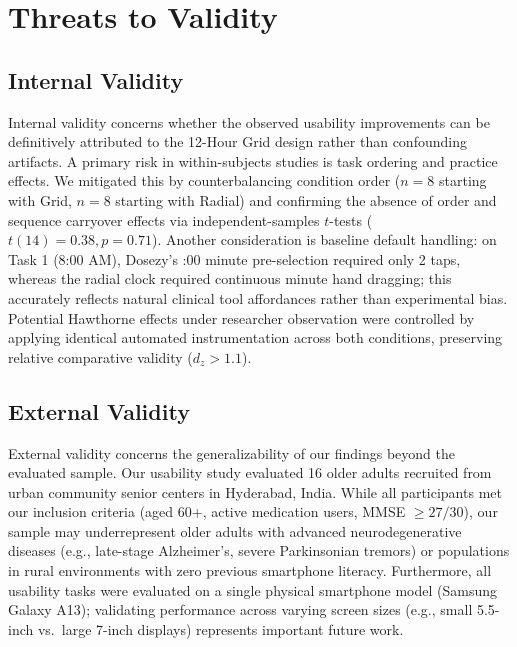 \documentclass[11pt,a4paper]{article}
\begin{document}
\section{Threats to Validity}
\label{sec:threats_to_validity}

\subsection{Internal Validity}
Internal validity concerns whether the observed usability improvements can be definitively attributed to the 12-Hour Grid design rather than confounding artifacts. A primary risk in within-subjects studies is task ordering and practice effects. We mitigated this by counterbalancing condition order ($n=8$ starting with Grid, $n=8$ starting with Radial) and confirming the absence of order and sequence carryover effects via independent-samples $t$-tests ($t(14) = 0.38, p = 0.71$). Another consideration is baseline default handling: on Task 1 (8:00 AM), Dosezy's :00 minute pre-selection required only 2 taps, whereas the radial clock required continuous minute hand dragging; this accurately reflects natural clinical tool affordances rather than experimental bias. Potential Hawthorne effects under researcher observation were controlled by applying identical automated instrumentation across both conditions, preserving relative comparative validity ($d_z > 1.1$).

\subsection{External Validity}
External validity concerns the generalizability of our findings beyond the evaluated sample. Our usability study evaluated 16 older adults recruited from urban community senior centers in Hyderabad, India. While all participants met our inclusion criteria (aged 60+, active medication users, MMSE $\ge 27/30$), our sample may underrepresent older adults with advanced neurodegenerative diseases (e.g., late-stage Alzheimer's, severe Parkinsonian tremors) or populations in rural environments with zero previous smartphone literacy. Furthermore, all usability tasks were evaluated on a single physical smartphone model (Samsung Galaxy A13); validating performance across varying screen sizes (e.g., small 5.5-inch vs.\ large 7-inch displays) represents important future work.
\end{document}
